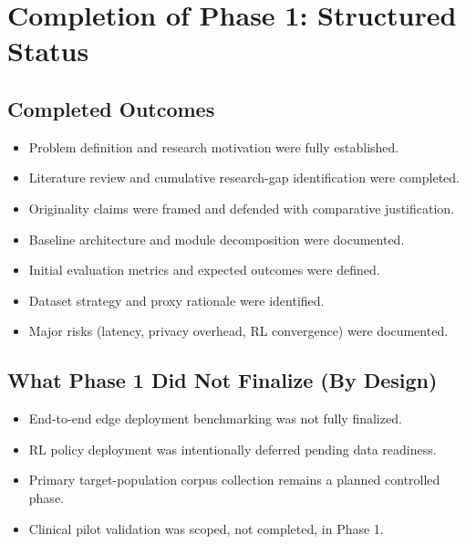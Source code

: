 \documentclass[10pt,a4paper]{article}
\begin{document}
\vspace{0.1cm}

\section{Completion of Phase 1: Structured Status}
\subsection{Completed Outcomes}
\begin{itemize}
\item Problem definition and research motivation were fully established.
\item Literature review and cumulative research-gap identification were completed.
\item Originality claims were framed and defended with comparative justification.
\item Baseline architecture and module decomposition were documented.
\item Initial evaluation metrics and expected outcomes were defined.
\item Dataset strategy and proxy rationale were identified.
\item Major risks (latency, privacy overhead, RL convergence) were documented.
\end{itemize}

\subsection{What Phase 1 Did Not Finalize (By Design)}
\begin{itemize}
\item End-to-end edge deployment benchmarking was not fully finalized.
\item RL policy deployment was intentionally deferred pending data readiness.
\item Primary target-population corpus collection remains a planned controlled phase.
\item Clinical pilot validation was scoped, not completed, in Phase 1.
\end{itemize}
\end{document}
